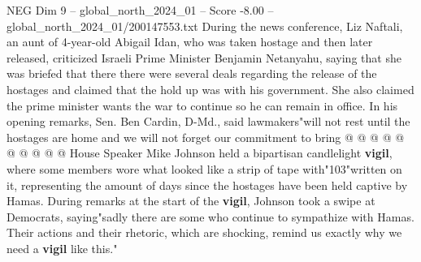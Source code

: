 \begin{textsample}{NEG Dim 9 – global\_north\_2024\_01 – Score -8.00 – global\_north\_2024\_01/200147553.txt}
During the news conference, Liz Naftali, an aunt of 4-year-old Abigail Idan, who was taken hostage and then later released, criticized Israeli Prime Minister Benjamin Netanyahu, saying that she was briefed that there there were several deals regarding the release of the hostages and claimed that the hold up was with his government.
She also claimed the prime minister wants the war to continue so he can remain in office.
In his opening remarks, Sen.
Ben Cardin, D-Md., said lawmakers"will not rest until the hostages are home and we will not forget our commitment to bring @ @ @ @ @ @ @ @ @ @ House Speaker Mike Johnson held a bipartisan candlelight \textbf{vigil}, where some members wore what looked like a strip of tape with"103"written on it, representing the amount of days since the hostages have been held captive by Hamas.
During remarks at the start of the \textbf{vigil}, Johnson took a swipe at Democrats, saying"sadly there are some who continue to sympathize with Hamas.
Their actions and their rhetoric, which are shocking, remind us exactly why we need a \textbf{vigil} like this."

\end{textsample}
